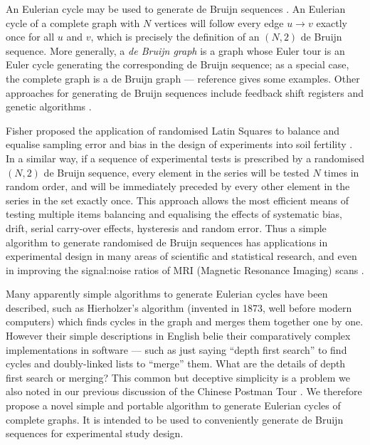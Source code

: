 \documentclass[12pt]{article}
\begin{document}
An Eulerian cycle may be used to generate de Bruijn sequences \cite{fleury,hierholzer}. An Eulerian cycle of a complete graph with $N$ vertices will follow every edge $u \rightarrow v$ exactly once for all $u$ and $v$, which is precisely the definition of an $(N,2)$ de Bruijn sequence. More generally, a \emph{de Bruijn graph\/} is a graph whose Euler tour is an Euler cycle generating the corresponding de Bruijn sequence; as a special case, the complete graph is a de Bruijn graph --- reference \cite{good} gives some examples. Other approaches for generating de Bruijn sequences include feedback shift registers and genetic algorithms \cite{turan,knuth4a}.%

Fisher proposed the application of randomised Latin Squares to balance and equalise sampling error and bias in the design of experiments into soil fertility \cite{fisher}. 
In a similar way, if a sequence of experimental tests is prescribed by a randomised $(N,2)$ de Bruijn sequence, every element in the series will be tested $N$ times in random order, and will be immediately preceded by every other element in the series in the set exactly once. This approach allows the most efficient means of testing multiple items balancing and equalising the effects of systematic bias, drift, serial carry-over effects, hysteresis and random error. Thus a simple algorithm to generate randomised de Bruijn sequences has applications in experimental design in many areas of scientific and statistical research, and even in improving the signal:noise ratios of MRI (Magnetic Resonance Imaging) scans \cite{aguirre}.

Many apparently simple algorithms to generate Eulerian cycles have been described, such as Hierholzer's algorithm \cite{hierholzer} (invented in 1873, well before modern computers) which finds cycles in the graph and merges them together one by one. However their simple descriptions in English belie their comparatively complex implementations in software --- such as just saying ``depth first search'' to find cycles and doubly-linked lists to ``merge'' them. What are the details of depth first search or merging? This common but deceptive simplicity is a problem we also noted in our previous discussion of the Chinese Postman Tour \cite{cpp}. We therefore propose a novel simple and portable algorithm to generate Eulerian cycles of complete graphs. It is intended to be used to conveniently generate de Bruijn sequences for experimental study design. 
\end{document}
